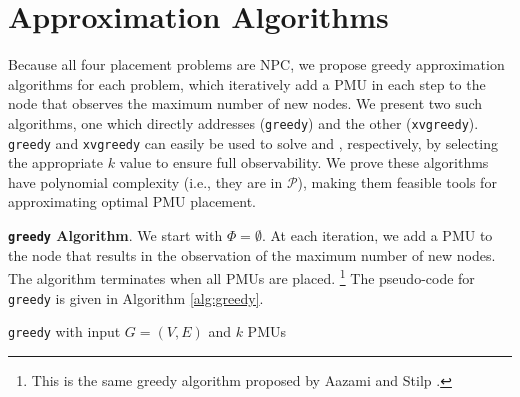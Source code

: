 \section{Approximation Algorithms}
\label{sec:approx}

Because all four placement problems are NPC, we propose greedy approximation algorithms for each problem, which iteratively add 
a PMU in each step to the node that observes the maximum number of new nodes. We present two such algorithms, one which directly addresses \maxinc ({\tt greedy}) and the other 
\xvalpart ({\tt xvgreedy}). {\tt greedy} and {\tt xvgreedy} can easily be used to solve \full and \xvals, respectively, by selecting the appropriate $k$ value to ensure full observability.
We prove these algorithms have polynomial complexity (i.e., they are in $\mathcal{P}$), making them feasible tools for approximating optimal PMU placement. 

{\bf {\tt greedy} Algorithm}. We start with $\Phi = \emptyset$.  At each iteration, we add a PMU to the node that results in the observation of the maximum number of 
new nodes. The algorithm terminates when all PMUs are placed.  {\footnote {\small This is the same greedy algorithm proposed by Aazami and Stilp \cite{Aazami07}. }}
The pseudo-code for {\tt greedy} is given in Algorithm \ref{alg:greedy}.

\begin{algorithm}
\caption{{\tt greedy} with input $G=(V,E)$ and $k$ PMUs}
\label{alg:greedy}

\begin{algorithmic}[1]

		\ENDFOR
		\REPEAT
				\ENDIF
			\ENDFOR
		\ENDIF
	\ENDFOR
\ENDFOR
\end{algorithmic}
\end{algorithm}

